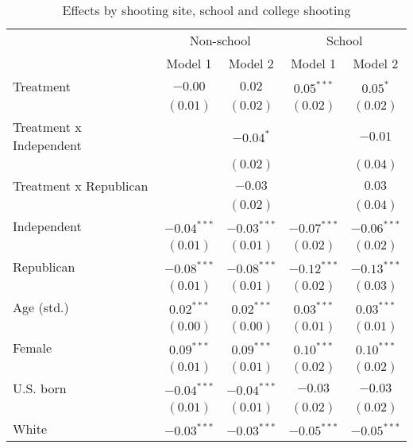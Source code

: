 
\begin{table}
\caption{Effects by shooting site, school and college shooting}
\begin{center}
\begin{tabular}{l c c c c}
\toprule
 & \multicolumn{2}{c}{Non-school} & \multicolumn{2}{c}{School} \\
\cmidrule(lr){2-3} \cmidrule(lr){4-5}
 & Model 1 & Model 2 & Model 1 & Model 2 \\
\midrule
Treatment               & $-0.00$       & $0.02$        & $0.05^{***}$  & $0.05^{*}$    \\
                        & $(0.01)$      & $(0.02)$      & $(0.02)$      & $(0.02)$      \\
Treatment x Independent &               & $-0.04^{*}$   &               & $-0.01$       \\
                        &               & $(0.02)$      &               & $(0.04)$      \\
Treatment x Republican  &               & $-0.03$       &               & $0.03$        \\
                        &               & $(0.02)$      &               & $(0.04)$      \\
Independent             & $-0.04^{***}$ & $-0.03^{***}$ & $-0.07^{***}$ & $-0.06^{***}$ \\
                        & $(0.01)$      & $(0.01)$      & $(0.02)$      & $(0.02)$      \\
Republican              & $-0.08^{***}$ & $-0.08^{***}$ & $-0.12^{***}$ & $-0.13^{***}$ \\
                        & $(0.01)$      & $(0.01)$      & $(0.02)$      & $(0.03)$      \\
Age (std.)              & $0.02^{***}$  & $0.02^{***}$  & $0.03^{***}$  & $0.03^{***}$  \\
                        & $(0.00)$      & $(0.00)$      & $(0.01)$      & $(0.01)$      \\
Female                  & $0.09^{***}$  & $0.09^{***}$  & $0.10^{***}$  & $0.10^{***}$  \\
                        & $(0.01)$      & $(0.01)$      & $(0.02)$      & $(0.02)$      \\
U.S. born               & $-0.04^{***}$ & $-0.04^{***}$ & $-0.03$       & $-0.03$       \\
                        & $(0.01)$      & $(0.01)$      & $(0.02)$      & $(0.02)$      \\
White                   & $-0.03^{***}$ & $-0.03^{***}$ & $-0.05^{***}$ & $-0.05^{***}$ \\

\end{tabular}
\end{center}
\end{table}
